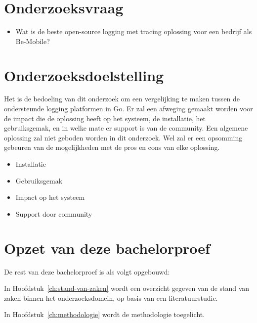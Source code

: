 \section{Onderzoeksvraag}
\label{sec:onderzoeksvraag}

\begin{itemize}
    \item  Wat is de beste open-source logging met tracing oplossing voor een bedrijf als Be-Mobile?
\end{itemize}

\section{Onderzoeksdoelstelling}
\label{sec:onderzoeksdoelstelling}

Het is de bedoeling van dit onderzoek om een vergelijking te maken tussen de ondersteunde logging platformen in Go. Er zal een afweging gemaakt worden voor de impact die de oplossing heeft op het systeem, de installatie, het gebruiksgemak, en in welke mate er support is van de community. Een algemene oplossing zal niet geboden worden in dit onderzoek. Wel zal er een opsomming gebeuren van de mogelijkheden met de pros en cons van elke oplossing.

\begin{itemize}
    \item Installatie 
    \item Gebruiksgemak
    \item Impact op het systeem
    \item Support door community
\end{itemize}

\section{Opzet van deze bachelorproef}
\label{sec:opzet-bachelorproef}


De rest van deze bachelorproef is als volgt opgebouwd:

In Hoofdstuk~\ref{ch:stand-van-zaken} wordt een overzicht gegeven van de stand van zaken binnen het onderzoeksdomein, op basis van een literatuurstudie.

In Hoofdstuk~\ref{ch:methodologie} wordt de methodologie toegelicht. 

